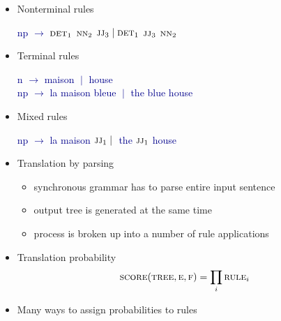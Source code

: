 \documentclass[landscape]{slides}
\newcommand{\example}[1]{\textcolor{darkblue}{\rm #1}}
\newcommand{\maths}[1]{\textcolor{purple}{#1}}
\begin{document}
\begin{itemize}\vspace{10mm}
\item Nonterminal rules\vspace{-5mm}
\begin{center}
\example{{\sc np} $\rightarrow$ $\text{\sc det}_1$ $\text{\sc nn}_2$ $\text{\sc jj}_3\;|\;\text{\sc det}_1$ $\text{\sc jj}_3$ $\text{\sc nn}_2$}
\end{center}
\item Terminal rules\vspace{-5mm}
\example{\begin{center}
{\sc n} $\rightarrow$ maison $\;|\;$ house\\[4mm]
{\sc np} $\rightarrow$ la maison bleue $\;|\;$ the blue house
\end{center}}
\item Mixed rules\vspace{-5mm}
\begin{center}
\example{{\sc np} $\rightarrow$ la maison $\text{\sc jj}_1\;|\;$ the $\text{\sc jj}_1$ house}
\end{center}
\end{itemize}


\begin{itemize}\vspace{10mm}
\item Translation by parsing
\begin{itemize}
\item synchronous grammar has to parse entire input sentence
\item output tree is generated at the same time
\item process is broken up into a number of rule applications
\end{itemize}
\item Translation probability
\maths{\begin{equation*}
\text{\sc score}(\text{\sc tree}, \text{\sc e}, \text{\sc f}) = \prod_i \text{\sc rule}_i
\end{equation*}}\vspace{-17mm}
\item Many ways to assign probabilities to rules
\end{itemize}

\end{document}
